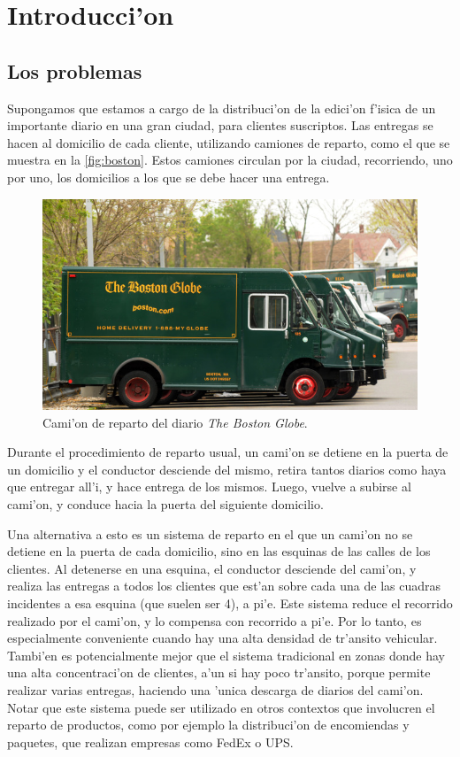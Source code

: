 \chapter{Introducci'on}

\section{Los problemas}

Supongamos que estamos a cargo de la distribuci'on de la edici'on f'isica de un importante diario en una gran ciudad, para clientes suscriptos. Las entregas se hacen al domicilio de cada cliente, utilizando camiones de reparto, como el que se muestra en la \autoref{fig:boston}. Estos camiones circulan por la ciudad, recorriendo, uno por uno, los domicilios a los que se debe hacer una entrega.

\begin{figure}
\includegraphics[scale=1.4]{img/boston.jpg}
\caption{Cami'on de reparto del diario \textit{The Boston Globe}.}
\label{fig:boston}
\end{figure}

Durante el procedimiento de reparto usual, un cami'on se detiene en la puerta de un domicilio y el conductor desciende del mismo, retira tantos diarios como haya que entregar all'i, y hace entrega de los mismos. Luego, vuelve a subirse al cami'on, y conduce hacia la puerta del siguiente domicilio.

Una alternativa a esto es un sistema de reparto en el que un cami'on no se detiene en la puerta de cada domicilio, sino en las esquinas de las calles de los clientes. Al detenerse en una esquina, el conductor desciende del cami'on, y realiza las entregas a todos los clientes que est'an sobre cada una de las cuadras incidentes a esa esquina (que suelen ser 4), a pi'e. Este sistema reduce el recorrido realizado por el cami'on, y lo compensa con recorrido a pi'e. Por lo tanto, es especialmente conveniente cuando hay una alta densidad de tr'ansito vehicular. Tambi'en es potencialmente mejor que el sistema tradicional en zonas donde hay una alta concentraci'on de clientes, a'un si hay poco tr'ansito, porque permite  realizar varias entregas, haciendo una 'unica descarga de diarios del cami'on. Notar que este sistema puede ser utilizado en otros contextos que involucren el reparto de productos, como por ejemplo la distribuci'on de encomiendas y paquetes, que realizan empresas como FedEx o UPS.

